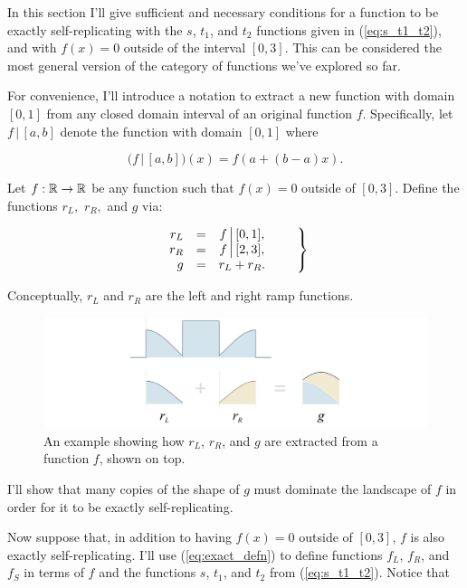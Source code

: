 \documentclass[20pt,]{extarticle}
\begin{document}
In this section I'll give sufficient and necessary conditions for a
function to be exactly self-replicating with the \(s\), \(t_1\), and
\(t_2\) functions given in (\ref{eq:s_t1_t2}), and with \(f(x)=0\)
outside of the interval \([0, 3]\). This can be considered the most
general version of the category of functions we've explored so far.

\newcommand{\restrict}{\,\big|\,}

For convenience, I'll introduce a notation to extract a new function
with domain \([0, 1]\) from any closed domain interval of an original
function \(f\). Specifically, let \(f \restrict [a, b]\) denote the
function with domain \([0,1]\) where

\[
\big(f \restrict [a,b]\big)(x) = f(a + (b-a)x).
\]

Let \(f:\mathbb{R}\to\mathbb{R}\) be any function such that \(f(x)=0\) outside of
\([0, 3]\). Define the functions \(r_L,\) \(r_R,\) and \(g\) via:

\begin{equation}\eqnset{\begin{array}{rlc}
r_L & = & f\restrict [0, 1], \\
r_R & = & f\restrict [2, 3], \\
g   & = & r_L + r_R.
\end{array}}\label{eq:rL_rR_g}\end{equation}

Conceptually, \(r_L\) and \(r_R\) are the left and right ramp functions.

\begin{figure}[htbp]
\centering
\includegraphics{images/nonpl_setup.png}
\caption{\label{fig:nonpl_setup}An example showing how \(r_L\), \(r_R\),
and \(g\) are extracted from a function \(f\), shown on
top.}\label{fig:nonplux5fsetup}
\end{figure}

I'll show that many copies of the shape of \(g\) must dominate the
landscape of \(f\) in order for it to be exactly self-replicating.

Now suppose that, in addition to having \(f(x)=0\) outside of \([0,3]\),
\(f\) is also exactly self-replicating. I'll use (\ref{eq:exact_defn})
to define functions \(f_L\), \(f_R\), and \(f_S\) in terms of \(f\) and
the functions \(s\), \(t_1\), and \(t_2\) from (\ref{eq:s_t1_t2}).
Notice that
\end{document}
